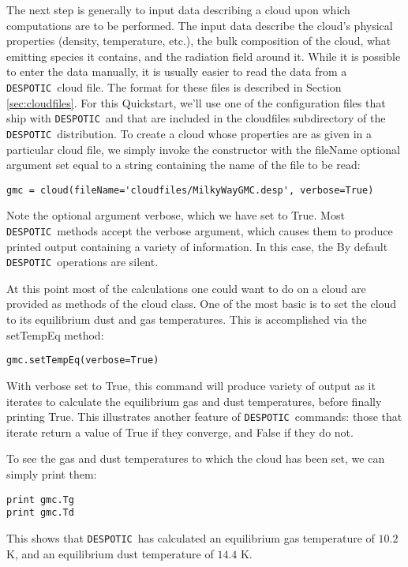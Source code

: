 \documentclass[12pt]{article}
\newcommand{\despotic}{\texttt{DESPOTIC}}
\begin{document}
The next step is generally to input data describing a cloud upon which computations are to be performed. The input data describe the cloud's physical properties (density, temperature, etc.), the bulk composition of the cloud, what emitting species it contains, and the radiation field around it. While it is possible to enter the data manually, it is usually easier to read the data from a \despotic\ cloud file. The format for these files is described in Section \ref{sec:cloudfiles}. For this Quickstart, we'll use one of the configuration files that ship with \despotic\, and that are included in the cloudfiles subdirectory of the \despotic\ distribution. To create a cloud whose properties are as given in a particular cloud file, we simply invoke the constructor with the fileName optional argument set equal to a string containing the name of the file to be read:
\begin{verbatim}
gmc = cloud(fileName='cloudfiles/MilkyWayGMC.desp', verbose=True)
\end{verbatim}
Note the optional argument verbose, which we have set to True. Most \despotic\ methods accept the verbose argument, which causes them to produce printed output containing a variety of information. In this case, the  By default \despotic\ operations are silent.

At this point most of the calculations one could want to do on a cloud are provided as methods of the cloud class. One of the most basic is to set the cloud to its equilibrium dust and gas temperatures. This is accomplished via the setTempEq method:
\begin{verbatim}
gmc.setTempEq(verbose=True)
\end{verbatim}
With verbose set to True, this command will produce variety of output as it iterates to calculate the equilibrium gas and dust temperatures, before finally printing True. This illustrates another feature of \despotic\ commands: those that iterate return a value of True if they converge, and False if they do not.

To see the gas and dust temperatures to which the cloud has been set, we can simply print them:
\begin{verbatim}
print gmc.Tg
print gmc.Td
\end{verbatim}
This shows that \despotic\ has calculated an equilibrium gas temperature of $10.2$ K, and an equilibrium dust temperature of $14.4$ K.
\end{document}
